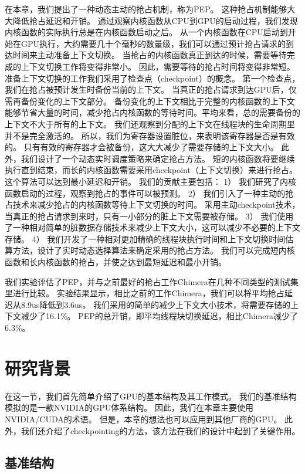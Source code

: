 在本章，我们提出了一种动态主动的抢占机制，称为PEP。
这种抢占机制能够大大降低抢占延迟和开销。
通过观察内核函数从CPU到GPU的启动过程，我们发现内核函数的实际执行总是在内核函数启动之后。
从一个内核函数在CPU启动到开始在GPU执行，大约需要几十个毫秒的数量级，我们可以通过预计抢占请求的到达时间来主动准备上下文切换。
当抢占的内核函数真正到达的时候，需要等待完成的上下文切换工作将变得非常小。
因此，需要等待的抢占时间将变得非常短。准备上下文切换的工作我们采用了检查点（checkpoint）的概念。
第一个检查点，我们在抢占被预计发生时备份当前的上下文。
当真正的抢占请求到达GPU后，仅需再备份变化的上下文部分。
备份变化的上下文相比于完整的内核函数的上下文能够节省大量的时间，减少抢占内核函数的等待时间。平均来看，总的需要备份的上下文不大于所有的上下文。
我们还观察到分配的上下文在线程块的生命周期里并不是完全激活的。
所以，我们为寄存器设置脏位，来表明该寄存器是否是有效的。
只有有效的寄存器才会被备份，这大大减少了需要存储的上下文大小。
此外，我们设计了一个动态实时调度策略来确定抢占方法。
短的内核函数将要继续执行直到结束，而长的内核函数需要采用checkpoint（上下文切换）来进行抢占。
这个算法可以达到最小延迟和开销。
我们的贡献主要包括：
1）	我们研究了内核函数启动的过程，观察到抢占的事件可以被预测。
2）	我们引入了一种主动的抢占技术来减少抢占的内核函数等待上下文切换的时间。
采用主动checkpoint技术，当真正的抢占请求到来时，只有一小部分的脏上下文需要被存储。
3）	我们使用了一种相对简单的脏数据存储技术来减少上下文大小，这可以减少不必要的上下文存储。
4）	我们开发了一种相对更加精确的线程块执行时间和上下文切换时间估算方法，设计了实时动态选择算法来确定采用的抢占方法。
我们可以完成短内核函数和长内核函数的抢占，并使之达到最短延迟和最小开销。

我们实验评估了PEP，并与之前最好的抢占工作Chimera在几种不同类型的测试集里进行比较。
实验结果显示，相比之前的工作Chimera，我们可以将平均抢占延迟从8.9us降低到3.6us。
我们采用的简单的减少上下文大小技术，将需要存储的上下文减少了16.1\%。
PEP的总开销，即平均线程块切换延迟，相比Chimera减少了6.3\%。

\section{研究背景}

在这一节，我们首先简单介绍了GPU的基本结构及其工作模式。
我们的基准结构模拟的是一款NVIDIA的GPU体系结构。
因此，我们在本章主要使用NVIDIA/CUDA的术语。
但是，本章的想法也可以应用到其他厂商的GPU。
此外，我们还介绍了checkpointing的方法，该方法在我们的设计中起到了关键作用。

\subsection{基准结构}

